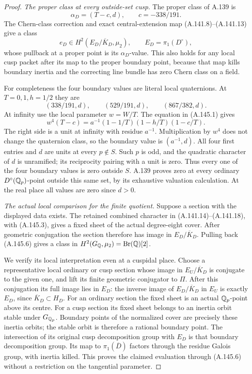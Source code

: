 \begin{proof}
\emph{The proper class at every outside-set cusp.}
The proper class of A.139 is
\[
               \alpha_D=(T-c,d),\qquad c=-338/191.
\tag{A.145.5}
\]
The Chern-class correction and exact central-extension map
(A.141.8)--(A.141.13) give a class
\[
 e_D\in H^2(E_D/\overline K_D,\mu_2),\qquad
 E_D=\pi_1(D^\circ),
\tag{A.145.6}
\]
whose pullback at a proper point is its \(\alpha_D\)-value.
This also holds for any local cusp packet after its map to the
proper boundary point, because that map kills boundary inertia
and the correcting line bundle has zero Chern class on a field.

For completeness the four boundary values are literal local
quaternions.  At \(T=0,1,h=1/2\) they are
\[
 (338/191,d),\qquad (529/191,d),\qquad(867/382,d).
\tag{A.145.7}
\]
At infinity use the local parameter \(w=W/T\).
The equation in (A.145.1) gives
\[
 w^4(T-c)=a^{-1}(1-1/T)(1-h/T)(1-c/T).
\tag{A.145.8}
\]
The right side is a unit at infinity with residue \(a^{-1}\).
Multiplication by \(w^4\) does not change the quaternion class,
so the boundary value is \((a^{-1},d)\).
All four first entries and \(d\) are units at every \(p\notin S\).
Such \(p\) is odd, and the quadratic character of \(d\) is
unramified; its reciprocity pairing with a unit is zero.
Thus every one of the four boundary values is zero outside \(S\).
A.139 proves zero at every ordinary \(D^\circ(\mathbb Q_p)\)-point
outside this same set, by its exhaustive valuation calculation.
At the real place all values are zero since \(d>0\).

\emph{The actual local comparison for the finite quotient.}
Suppose a section with the displayed data exists.
The retained combined character in (A.141.14)--(A.141.18),
with (A.145.3), gives a fixed sheet of the actual degree-eight
cover.  After geometric conjugation the section therefore has
image in \(E_D/\overline K_D\).
Pulling back (A.145.6) gives a class in
\(H^2(G_\mathbb Q,\mu_2)=\operatorname{Br}(\mathbb Q)[2]\).

We verify its local interpretation even at a cuspidal place.
Choose a representative local ordinary or cusp section whose
image in \(E_U/\overline K_D\) is conjugate to the given one,
and lift its finite geometric conjugator to \(\Pi\).
After this conjugation its full image lies in \(E_D\): the
inverse image of \(E_D/\overline K_D\) in \(E_U\) is exactly
\(E_D\), since \(\overline K_D\subset H_D\).
For an ordinary section the fixed sheet is an actual
\(\mathbb Q_p\)-point above its centre.  For a cusp section its fixed
sheet belongs to an inertia orbit stable under \(G_{\mathbb Q_p}\).
Boundary points of the normalized cover are precisely these
inertia orbits; the stable orbit is therefore a rational
boundary point.  The intersection of its original cusp
decomposition group with \(E_D\) is that boundary decomposition
group.  Its map to \(\pi_1(\overline D)\) factors through the
residue Galois group, with inertia killed.  This proves the
claimed evaluation through (A.145.6) without a restriction on
the tangential parameter.


\end{proof}

